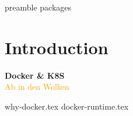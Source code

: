 \RequirePackage{import}
{preamble}
{packages}


\section{Introduction}\label{sec:introduction}

\begin{frame}[c]
    \centering
    \Huge
    \textbf{Docker \& K8S}
    \\
    \vspace{1ex}
    \Large
    \textcolor{orange}{Ab in den Wolken}
\end{frame}
{why-docker.tex}
{docker-runtime.tex}


